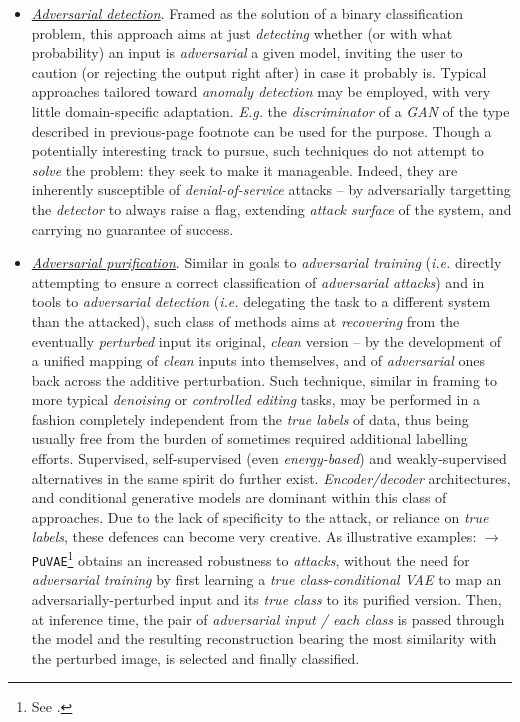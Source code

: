\begin{itemize}
    \item \textit{\underline{Adversarial detection}}. Framed as the solution of a binary classification problem, this approach aims at just \textit{detecting} whether (or with what probability) an input is \textit{adversarial} \wrt a given model, inviting the user to caution (or rejecting the output right after) in case it probably is. Typical approaches tailored toward \textit{anomaly detection} may be employed, with very little domain-specific adaptation. \textit{E.g.} the \textit{discriminator} of a \textit{GAN} of the type described in previous-page footnote can be used for the purpose.\newline
    Though a potentially interesting track to pursue, such techniques do not attempt to \textit{solve} the problem: they seek to make it manageable. Indeed, they are inherently susceptible of \textit{denial-of-service} attacks -- by adversarially targetting the \textit{detector} to always raise a flag, extending \textit{attack surface} of the system, and carrying no guarantee of success.
    \item \textit{\underline{Adversarial purification}}. Similar in goals to \textit{adversarial training} (\textit{i.e.} directly attempting to ensure a correct classification of \textit{adversarial attacks}) and in tools to \textit{adversarial detection} (\textit{i.e.} delegating the task to a different system than the attacked), such class of methods aims at \textit{recovering} from the eventually \textit{perturbed} input its original, \textit{clean} version -- by the development of a unified mapping of \textit{clean} inputs into themselves, and of \textit{adversarial} ones back across the additive perturbation. Such technique, similar in framing to more typical \textit{denoising} or \textit{controlled editing} tasks, may be performed in a fashion completely independent from the \textit{true labels} of data, thus being usually free from the burden of sometimes required additional labelling efforts. Supervised, self-supervised (even \textit{energy-based}) and weakly-supervised alternatives in the same spirit do further exist. \textit{Encoder/decoder} architectures, and conditional generative models are dominant within this class of approaches.\newline
    Due to the lack of specificity to the attack, or reliance on \textit{true labels}, these defences can become very creative. As illustrative examples:\newline
    $\longrightarrow\ $\texttt{PuVAE}\footnote{See \cite{HwangEtAl2019PuVAE}.} obtains an increased robustness to \textit{attacks}, without the need for \textit{adversarial training} by first learning a \textit{true class}-\textit{conditional VAE} to map an adversarially-perturbed input and its \textit{true class} to its purified version. Then, at inference time, the pair of \textit{adversarial input / each class} is passed through the model and the resulting reconstruction bearing the most similarity with the perturbed image, is selected and finally classified.

\end{itemize}
